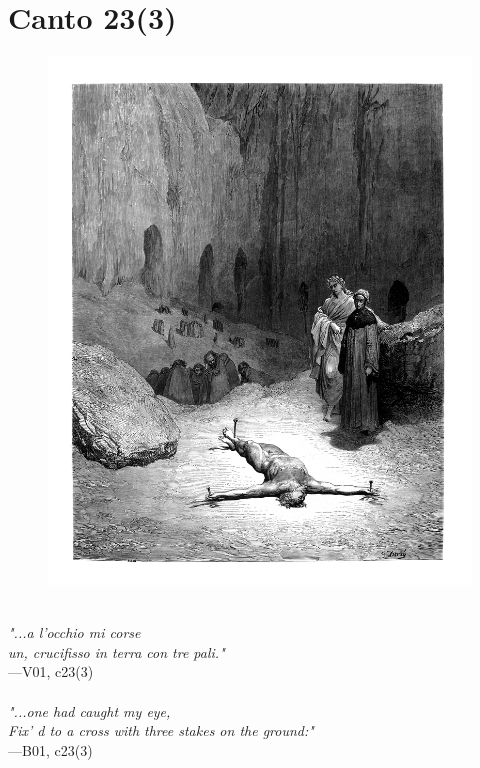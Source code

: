 \documentclass[../Dore_vision.tex]{subfiles}
\begin{document}
\newpage

\section{Canto 23(3)}

\begin{figure}[ht]
\centering
\includegraphics[height=\figsize]{illustrations/book_1/V01, c23(3).jpg}
\end{figure}

\begin{center}
\begin{minipage}{0.8\linewidth}
\textit{\\
"...a l’occhio mi corse\\un, crucifisso in terra con tre pali."} \\
—V01, c23(3) \\~\\
\textit{"...one had caught my eye,\\Fix' d to a cross with three stakes on the ground:"} \\
—B01, c23(3)
\end{minipage}
\end{center}
\end{document}
